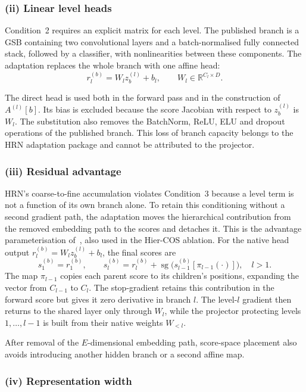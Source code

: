 \subsubsection{(ii) Linear level heads}

Condition~2 requires an explicit matrix for each level. The published branch
is a GSB containing two convolutional layers and a batch-normalised fully
connected stack, followed by a classifier, with nonlinearities between these
components. The adaptation replaces the whole branch with one affine head:
\[
r_l^{(b)}=W_l z_b^{(l)}+b_l,
\qquad W_l\in\mathbb{R}^{C_l\times D}.
\]

The direct head is used both in the forward pass and in the construction of
$A^{(l)}[b]$. Its bias is excluded because the score Jacobian with respect to
$z_b^{(l)}$ is $W_l$. The substitution also removes the BatchNorm, ReLU, ELU
and dropout operations of the published branch. This loss of branch capacity
belongs to the HRN adaptation package and cannot be attributed to the projector.

\subsubsection{(iii) Residual advantage}

HRN's coarse-to-fine accumulation violates Condition~3 because a level term is
not a function of its own branch alone. To retain this conditioning without a
second gradient path, the adaptation moves the hierarchical contribution from
the removed embedding path to the scores and detaches it. This is the advantage
parameterisation of~\cite{fiaschi2024informed}, also used in the Hier-COS
ablation. For the native head output $r_l^{(b)}=W_lz_b^{(l)}+b_l$, the final
scores are
\[
s_1^{(b)}=r_1^{(b)},\qquad
s_l^{(b)} = r_l^{(b)}
+ \operatorname{sg}\!\big(s_{l-1}^{(b)}[\pi_{l-1}(\cdot)]\big),
\quad l>1.
\]
The map $\pi_{l-1}$ copies each parent score to its children's positions,
expanding the vector from $C_{l-1}$ to $C_l$. The stop-gradient retains this
contribution in the forward score but gives it zero derivative in branch $l$.
The level-$l$ gradient then returns to the shared layer only through $W_l$, while
the projector protecting levels $1,\ldots,l-1$ is built from their native
weights $W_{<l}$.

After removal of the $E$-dimensional embedding path, score-space placement also
avoids introducing another hidden branch or a second affine map.

\subsubsection{(iv) Representation width}

